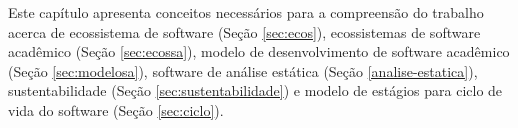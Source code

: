 \label{fundamentacao}

Este capítulo apresenta conceitos necessários para a compreensão do trabalho
acerca de ecossistema de software (Seção \ref{sec:ecos}),
ecossistemas de software acadêmico (Seção \ref{sec:ecossa}),
modelo de desenvolvimento de software acadêmico (Seção \ref{sec:modelosa}),
software de análise estática (Seção \ref{analise-estatica}),
sustentabilidade (Seção \ref{sec:sustentabilidade}) e modelo de estágios
para ciclo de vida do software (Seção \ref{sec:ciclo}).





